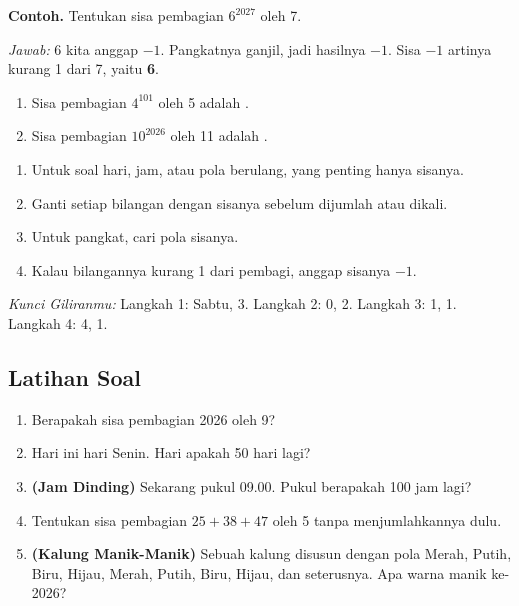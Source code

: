 \documentclass[11pt,a4paper]{article}
\begin{document}
\begin{contoh}
\textbf{Contoh.} Tentukan sisa pembagian $6^{2027}$ oleh 7.

\textit{Jawab:} 6 kita anggap $-1$. Pangkatnya ganjil, jadi hasilnya $-1$. Sisa $-1$ artinya
kurang 1 dari 7, yaitu \textbf{6}.
\end{contoh}

\begin{giliranmu}
\begin{enumerate}[label=\alph*.]
    \item Sisa pembagian $4^{101}$ oleh 5 adalah \kosong.
    \item Sisa pembagian $10^{2026}$ oleh 11 adalah \kosong.
\end{enumerate}
\end{giliranmu}

\begin{rangkuman}
\begin{enumerate}
    \item Untuk soal hari, jam, atau pola berulang, yang penting hanya sisanya.
    \item Ganti setiap bilangan dengan sisanya sebelum dijumlah atau dikali.
    \item Untuk pangkat, cari pola sisanya.
    \item Kalau bilangannya kurang 1 dari pembagi, anggap sisanya $-1$.
\end{enumerate}
\end{rangkuman}

\textit{Kunci Giliranmu:} Langkah 1: Sabtu, 3. \quad Langkah 2: 0, 2. \quad Langkah 3: 1, 1.
\quad Langkah 4: 4, 1.

\newpage
\subsection*{Latihan Soal}

\begin{enumerate}
    \item Berapakah sisa pembagian 2026 oleh 9?
    \item Hari ini hari Senin. Hari apakah 50 hari lagi?
    \item \textbf{(Jam Dinding)} Sekarang pukul 09.00. Pukul berapakah 100 jam lagi?
    \item Tentukan sisa pembagian $25 + 38 + 47$ oleh 5 tanpa menjumlahkannya dulu.
    \item \textbf{(Kalung Manik-Manik)} Sebuah kalung disusun dengan pola Merah, Putih, Biru, Hijau,
          Merah, Putih, Biru, Hijau, dan seterusnya. Apa warna manik ke-2026?
\end{enumerate}
\end{document}
